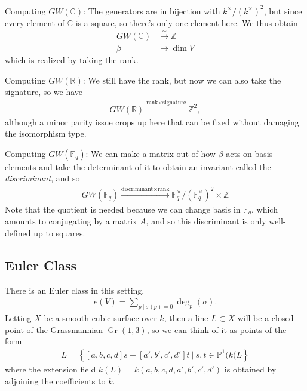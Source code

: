 \begin{example}

Computing \(GW({\mathbb{C}})\): The generators are in bijection with
\(k^\times/(k^\times)^2\), but since every element of \({\mathbb{C}}\)
is a square, so there's only one element here. We thus obtain
\begin{align*}
GW({\mathbb{C}}) &\xrightarrow{\sim} {\mathbb{Z}}\\
\beta &\mapsto \dim V
\end{align*}
which is realized by taking the rank.

\end{example}

\begin{example}

Computing \(GW({\mathbb{R}})\): We still have the rank, but now we can
also take the signature, so we have
\begin{align*}
GW({\mathbb{R}}) \xrightarrow{\text{rank} \times \text{signature}} {\mathbb{Z}}^2,
\end{align*}
although a minor parity issue crops up here that can be fixed without
damaging the isomorphism type.

\end{example}

\begin{example}

Computing \(GW({\mathbb{F}}_q)\): We can make a matrix out of how
\(\beta\) acts on basis elements and take the determinant of it to
obtain an invariant called the \emph{discriminant}, and so
\begin{align*}
GW({\mathbb{F}}_q) \xrightarrow{\text{discriminant} \times \text{rank}} {\mathbb{F}}_q^\times/({\mathbb{F}}_q^\times)^2 \times {\mathbb{Z}}
\end{align*}
Note that the quotient is needed because we can change basis in
\({\mathbb{F}}_q\), which amounts to conjugating by a matrix \(A\), and
so this discriminant is only well-defined up to squares.

\end{example}

\hypertarget{euler-class}{%
\subsection{Euler Class}\label{euler-class}}

There is an Euler class in this setting,
\begin{align*}
e(V) = \sum_{p{~\mathrel{\Big|}~}\sigma(p) = 0} \deg_p(\sigma).
\end{align*}
Letting \(X\) be a smooth cubic surface over \(k\), then a line
\(L\subset X\) will be a closed point of the Grassmannian
\({\operatorname{Gr}}(1,3)\), so we can think of it as points of the
form
\begin{align*}
L = \left\{{[a,b,c,d]s + [a',b',c',d']t {~\mathrel{\Big|}~}s,t \in {\mathbb{P}}^1(k(L}\right\}
\end{align*}
where the extension field \(k(L) = k(a,b,c,d,a',b',c',d')\) is obtained
by adjoining the coefficients to \(k\).

